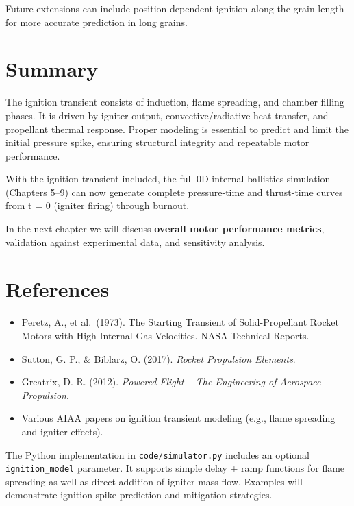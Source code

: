 \documentclass[
  letterpaper,
  DIV=11,
  numbers=noendperiod]{scrreprt}
\providecommand{\tightlist}{%
  \setlength{\itemsep}{0pt}\setlength{\parskip}{0pt}}
\begin{document}
Future extensions can include position-dependent ignition along the
grain length for more accurate prediction in long grains.

\section{Summary}\label{summary-4}

The ignition transient consists of induction, flame spreading, and
chamber filling phases. It is driven by igniter output,
convective/radiative heat transfer, and propellant thermal response.
Proper modeling is essential to predict and limit the initial pressure
spike, ensuring structural integrity and repeatable motor performance.

With the ignition transient included, the full 0D internal ballistics
simulation (Chapters 5--9) can now generate complete pressure-time and
thrust-time curves from t = 0 (igniter firing) through burnout.

In the next chapter we will discuss \textbf{overall motor performance
metrics}, validation against experimental data, and sensitivity
analysis.

\section{References}\label{references-2}

\begin{itemize}
\tightlist
\item
  Peretz, A., et al.~(1973). The Starting Transient of Solid-Propellant
  Rocket Motors with High Internal Gas Velocities. NASA Technical
  Reports.
\item
  Sutton, G. P., \& Biblarz, O. (2017). \emph{Rocket Propulsion
  Elements}.
\item
  Greatrix, D. R. (2012). \emph{Powered Flight -- The Engineering of
  Aerospace Propulsion}.
\item
  Various AIAA papers on ignition transient modeling (e.g., flame
  spreading and igniter effects).
\end{itemize}

\begin{tcolorbox}[enhanced jigsaw, arc=.35mm, bottomrule=.15mm, bottomtitle=1mm, breakable, colback=white, colbacktitle=quarto-callout-note-color!10!white, colframe=quarto-callout-note-color-frame, coltitle=black, left=2mm, leftrule=.75mm, opacityback=0, opacitybacktitle=0.6, rightrule=.15mm, title=\textcolor{quarto-callout-note-color}{\faInfo}\hspace{0.5em}{Note}, titlerule=0mm, toprule=.15mm, toptitle=1mm]

The Python implementation in \texttt{code/simulator.py} includes an
optional \texttt{ignition\_model} parameter. It supports simple delay +
ramp functions for flame spreading as well as direct addition of igniter
mass flow. Examples will demonstrate ignition spike prediction and
mitigation strategies.

\end{tcolorbox}
\end{document}
